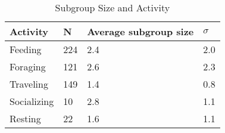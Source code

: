 \documentclass{../../../coursework}
\begin{document}
\begin{table}
    \caption{Subgroup Size and Activity}
    \label{tbl:subgroup_activity}
    \begin{tabu} to \linewidth{XXXX}
        \toprule
        Activity & N & Average subgroup size & \(\sigma\) \\
        \midrule
        Feeding & 224 & 2.4 & 2.0 \\
        Foraging & 121 & 2.6 & 2.3 \\
        Traveling & 149 & 1.4 & 0.8 \\
        Socializing & 10 & 2.8 & 1.1 \\
        Resting & 22 & 1.6 & 1.1 \\
        \bottomrule
    \end{tabu}
    \par{}
\end{table}
\end{document}
